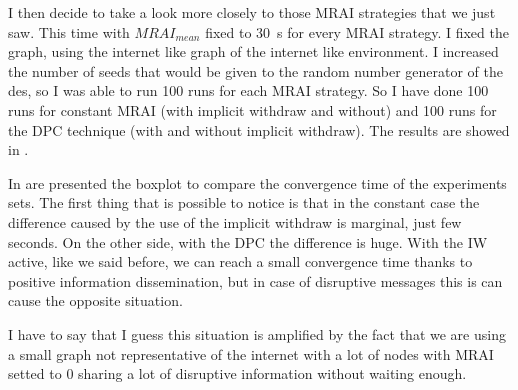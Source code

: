 \documentclass[10pt,conference,letterpaper]{IEEEtran}
\begin{document}
I then decide to take a look more closely to those \ac{MRAI} strategies that we
just saw.
This time with $MRAI_{mean}$ fixed to \SI{30}{\second} for every \ac{MRAI} strategy.
I fixed the graph, using the internet like graph of the internet like environment.
I increased the number of seeds that would be given to the random number generator
of the des, so I was able to run \num{100} runs for each \ac{MRAI} strategy.
So I have done \num{100} runs for constant \ac{MRAI} (with implicit withdraw and without)
and \num{100} runs for the \ac{DPC} technique (with and without implicit withdraw).
The results are showed in .

In  are presented the boxplot to compare
the convergence time of the experiments sets.
The first thing that is possible to notice is that in the constant case the 
difference caused by the use of the implicit withdraw is marginal, just few seconds.
On the other side, with the \ac{DPC} the difference is huge. 
With the IW active, like we said before, we can reach a small convergence time
thanks to positive information dissemination, but in case of disruptive messages
this is can cause the opposite situation.

I have to say that I guess this situation is amplified by the fact that we are
using a small graph not representative of the internet with a lot of nodes 
with \ac{MRAI} setted to \num{0} sharing a lot of disruptive information without
waiting enough.
\end{document}
